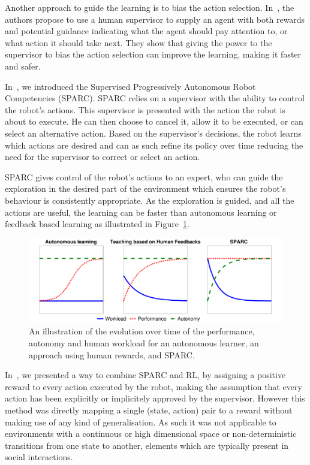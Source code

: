 \documentclass[letterpaper]{article} %
\begin{document}
Another approach to guide the learning is to bias the action selection.
In~\cite{thomaz2008teachable}, the authors propose to use a human supervisor to
supply an agent with both rewards and potential guidance indicating what the
agent should pay attention to, or what action it should take next. They show
that giving the power to the supervisor to bias the action selection can improve
the learning, making it faster and safer.

In~\cite{senft2015sparc}, we introduced the Supervised Progressively Autonomous
Robot Competencies (SPARC). SPARC relies on a supervisor with the ability to
control the robot's actions. This supervisor is presented with the action the
robot is about to execute. He can then choose to cancel it, allow it to be
executed, or can select an alternative action. Based on the supervisor's
decisions, the robot learns which actions are desired and can as such refine its
policy over time reducing the need for the supervisor to correct or select an
action.

SPARC gives control of the robot's actions to an expert, who can guide the
exploration in the desired part of the environment which ensures the robot's
behaviour is consistently appropriate. As the exploration is guided, and all the
actions are useful, the learning can be faster than autonomous learning or
feedback based learning as illustrated in Figure~\ref{fig:comparison}.

\begin{figure}
    \centering
    \includegraphics[width=0.9\linewidth]{./figs/motivation.pdf}
    \caption{An illustration of the evolution over time of the performance,
    autonomy and human workload for an autonomous learner, an approach using
    human rewards, and SPARC.}
    \label{fig:comparison}
\end{figure}

In~\cite{senft2017supervised}, we presented a way to combine SPARC and RL, by
assigning a positive reward to every action executed by the robot, making the
assumption that every action has been explicitly or implicitely approved by the
supervisor. However this method was directly mapping a single (state, action)
pair to a reward without making use of any kind of generalisation. As such it
was not applicable to environments with a continuous or high dimensional space
or non-deterministic transitions from one state to another, elements which are
typically present in social interactions.
\end{document}

